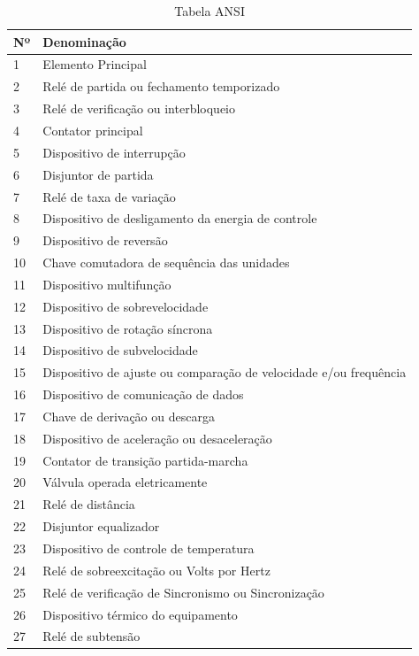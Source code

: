 \documentclass[a5paper,english,spanish,brazil]{ufsc-thesis}
\begin{document}
\begin{longtable}{|l|p{}|}
\caption{Tabela ANSI}
 \\ \hline
  Nº & Denominação \\ \hline
  1 & Elemento Principal \\ \hline
  2 & Relé de partida ou fechamento temporizado \\ \hline
  3 & Relé de verificação ou interbloqueio \\ \hline
  4 & Contator principal \\ \hline
  5 & Dispositivo de interrupção \\ \hline
  6 & Disjuntor de partida \\ \hline
  7 & Relé de taxa de variação \\ \hline
  8 & Dispositivo de desligamento da energia de controle \\ \hline
  9 & Dispositivo de reversão \\ \hline
  10 & Chave comutadora de sequência das unidades \\ \hline
  11 & Dispositivo multifunção \\ \hline
  12 & Dispositivo de sobrevelocidade \\ \hline
  13 & Dispositivo de rotação síncrona \\ \hline
  14 & Dispositivo de subvelocidade \\ \hline
  15 & Dispositivo de ajuste ou comparação de velocidade e/ou frequência \\ \hline
  16 & Dispositivo de comunicação de dados \\ \hline
  17 & Chave de derivação ou descarga \\ \hline
  18 & Dispositivo de aceleração ou desaceleração \\ \hline
  19 & Contator de transição partida-marcha \\ \hline
  20 & Válvula operada eletricamente \\ \hline
  21 & Relé de distância \\ \hline
  22 & Disjuntor equalizador \\ \hline
  23 & Dispositivo de controle de temperatura \\ \hline
  24 & Relé de sobreexcitação ou Volts por Hertz \\ \hline
  25 & Relé de verificação de Sincronismo ou Sincronização \\ \hline
  26 & Dispositivo térmico do equipamento \\ \hline
  27 & Relé de subtensão \\ \hline

\end{longtable}
\end{document}
